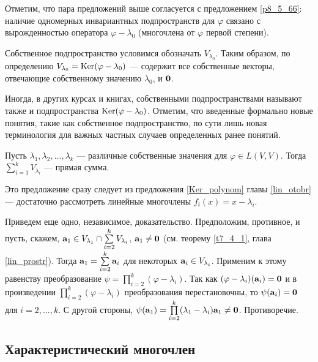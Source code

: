 \otstup
Отметим, что пара предложений выше согласуется с предложением \ref{p8_5_66}: наличие одномерных 
инвариантных подпространств для $\varphi$ связано с вырожденностью оператора 
$\varphi - \lambda _0$ (многочлена от $\varphi$ первой степени).


Собственное подпространство условимся обозначать $V_{\lambda_0}$.
Таким образом, по определению $V_{\lambda_0} = \mathop{\rm Ker}\nolimits (\varphi -\lambda_0)$ ---
содержит все собственные векторы,  отвечающие собственному значению
$\lambda_0$, и $\mathbf{0}$.

{\footnotesize Иногда, в других курсах и книгах,  собственными подпространствами 
называют также и подпространства $\mathop{\rm Ker}\nolimits (\varphi -\lambda_0)$.
Отметим, что введенные формально новые понятия, такие как собственное подпространство,
по сути лишь новая терминология для важных частных случаев определенных ранее понятий.}


\begin{predl}\label{p8_5_8}
Пусть $\lambda _1, \lambda _2, \ldots , \lambda _k$ --- различные собственные значения для
$\varphi \in L(V, V)$. Тогда $\sum\limits_{i=1}^{k} V_{\lambda _i} $ --- прямая сумма.
\end{predl}
\dok Это предложение сразу следует из предложения \ref{Ker_polynom} главы
\ref{lin_otobr} --- достаточно рассмотреть линейные многочлены $f_i(x) = x- \lambda _i$.

 Приведем еще одно, независимое, доказательство. 
Предположим, противное, и пусть, скажем, $\mathbf{a}_1\in V_{\lambda _1}\cap \sum\limits_{i=2}^{k} V_{\lambda _i}$, 
$\mathbf{a}_1\neq \mathbf{0}$ (см. теорему \ref{t7_4_1}, глава \ref{lin_prostr}).
Тогда $\mathbf{a}_1 = \sum\limits_{i=2}^{k} \mathbf{a}_i$ для некоторых $ \mathbf{a}_i\in V_{\lambda _i}$.
Применим к этому равенству преобразование $\psi = \prod\limits_{i=2}^{k}(\varphi-\lambda _i)$.
Так как $(\varphi-\lambda _i)(\mathbf{a}_i)=\mathbf{0}$ и в произведении $\prod\limits_{i=2}^{k}(\varphi-\lambda _i)$ преобразования перестановочны, то
$\psi (\mathbf{a}_i)=\mathbf{0}$ для $i=2, \ldots, k$. С другой стороны, $\psi (\mathbf{a}_1 ) = \prod\limits_{i=2}^{k}(\lambda_1-\lambda _i)\mathbf{a}_1\neq \mathbf{0}$.
Противоречие.
\edok

\subsection{Характеристический многочлен}

